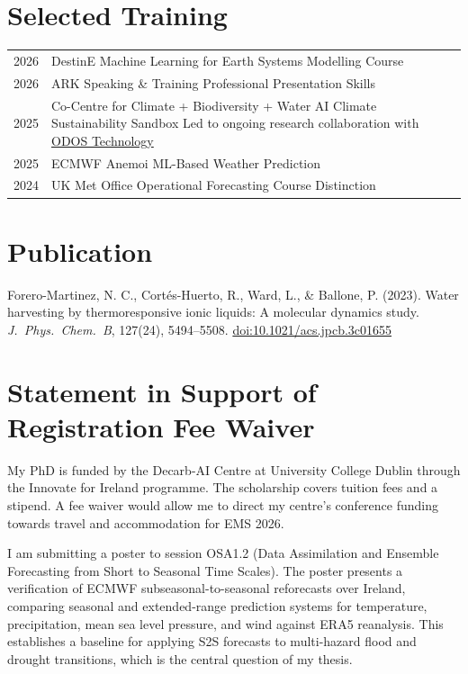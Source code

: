 \documentclass[a4paper,11pt]{article}
\begin{document}
{\section{Selected Training}

\begin{tabularx}{\linewidth}{@{}l X@{}}
2026 & DestinE \textbar{} Machine Learning for Earth Systems Modelling Course \\
2026 & ARK Speaking \& Training \textbar{} Professional Presentation Skills \\
2025 & Co-Centre for Climate + Biodiversity + Water \textbar{} AI Climate Sustainability Sandbox \textbar{} Led to ongoing research collaboration with \href{https://odostech.com/}{ODOS Technology} \\
2025 & ECMWF \textbar{} Anemoi ML-Based Weather Prediction \\
2024 & UK Met Office \textbar{} Operational Forecasting Course \textbar{} Distinction \\
\end{tabularx}

\section{Publication}

Forero-Martinez, N. C., Cort\'{e}s-Huerto, R., Ward, L., \& Ballone, P. (2023).
Water harvesting by thermoresponsive ionic liquids: A molecular dynamics study.
\emph{J.\ Phys.\ Chem.\ B}, 127(24), 5494--5508.
\href{https://doi.org/10.1021/acs.jpcb.3c01655}{doi:10.1021/acs.jpcb.3c01655}

\newpage
\section*{Statement in Support of Registration Fee Waiver}

My PhD is funded by the Decarb-AI Centre at University College Dublin through the Innovate for Ireland programme. The scholarship covers tuition fees and a stipend. A fee waiver would allow me to direct my centre's conference funding towards travel and accommodation for EMS 2026.

I am submitting a poster to session OSA1.2 (Data Assimilation and Ensemble Forecasting from Short to Seasonal Time Scales). The poster presents a verification of ECMWF subseasonal-to-seasonal reforecasts over Ireland, comparing seasonal and extended-range prediction systems for temperature, precipitation, mean sea level pressure, and wind against ERA5 reanalysis. This establishes a baseline for applying S2S forecasts to multi-hazard flood and drought transitions, which is the central question of my thesis.

}
\end{document}
